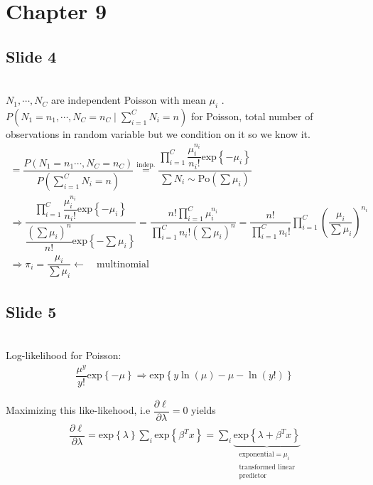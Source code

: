 \section{Chapter 9}
\subsection{Slide 4}\hfill\\
\noindent $N_1,\cdots,N_C$ are independent Poisson with mean $\mu_i$ . $P(N_1=n_1,\cdots,N_C=n_C\mid\sum_{i=1}^{C}N_i=n)$ for Poisson, total number of observations in random variable but we condition on it so we know it.
\begin{equation*}
  \begin{gathered}
    = \dfrac{P(N_1=n_1\cdots,N_C=n_C)}{P(\sum_{i=1}^{C}N_i=n)} \stackrel{\text{indep.}}{=}\dfrac{\prod_{i=1}^{C}\dfrac{\mu_i^{n_i}}{n_i!}\text{exp}\left\{-\mu_i\right\}}{\sum N_i\sim \text{Po}(\sum \mu_i)}\\
    \Rightarrow \dfrac{\prod_{i=1}^{C}\dfrac{\mu_i^{n_i}}{n_i!}\text{exp}\left\{-\mu_i\right\}}{\dfrac{\left(\sum \mu_i\right)^n}{n!}\text{exp}\left\{-\sum \mu_i\right\}} = \dfrac{n!\prod_{i=1}^{C}\mu_i^{n_i}}{\prod_{i=1}^{C}n_i!\left(\sum \mu_i\right)^n} = \dfrac{n!}{\prod_{i=1}^{C}n_i!}\prod_{i=1}^{C}\left(\dfrac{\mu_i}{\sum \mu_i}\right)^{n_i}\\
    \Rightarrow \pi_i = \dfrac{\mu_i}{\sum \mu_i}\leftarrow \quad\text{multinomial}
  \end{gathered}
\end{equation*}
\par\bigskip
\subsection{Slide 5}\hfill\\
\noindent Log-likelihood for Poisson: 
\begin{equation*}
  \begin{gathered}
    \dfrac{\mu^y}{y!}\text{exp}\left\{-\mu\right\}\Rightarrow \text{exp}\left\{y\ln{\left(\mu\right)}-\mu-\ln{\left(y!\right)}\right\}
  \end{gathered}
\end{equation*}\par
\noindent Maximizing this like-likehood, i.e $\dfrac{\partial \ell}{\partial \lambda} =0 $ yields
\begin{equation*}
  \begin{gathered}
    \dfrac{\partial \ell}{\partial \lambda} = \text{exp}\left\{\lambda\right\}\sum_i\text{exp}\left\{\beta^Tx\right\} =\sum_i\underbrace{\text{exp}\left\{\lambda+\beta^Tx\right\}}_{\substack{\text{exponential}=\mu_i\\\text{transformed linear}\\\text{predictor}}}
  \end{gathered}
\end{equation*}
\par\bigskip
